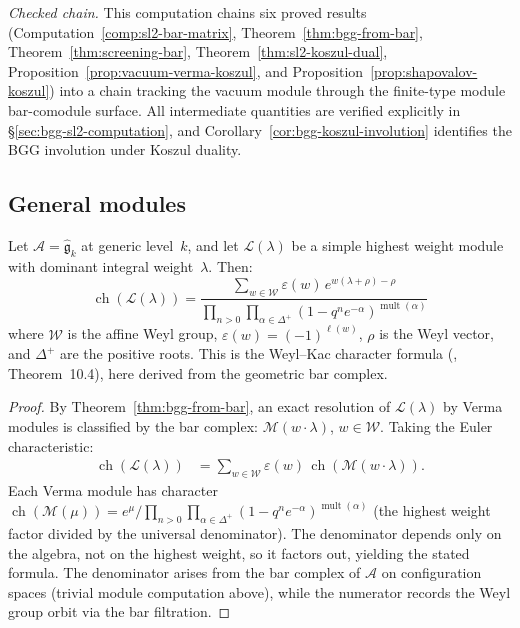 \begin{computation}
\emph{Checked chain.}
This computation chains six proved results (Computation~\ref{comp:sl2-bar-matrix},
Theorem~\ref{thm:bgg-from-bar}, Theorem~\ref{thm:screening-bar},
Theorem~\ref{thm:sl2-koszul-dual},
Proposition~\ref{prop:vacuum-verma-koszul},
and Proposition~\ref{prop:shapovalov-koszul}) into a chain tracking
the vacuum module through the finite-type module bar-comodule surface.
All intermediate quantities are verified explicitly in
\S\ref{sec:bgg-sl2-computation}, and
Corollary~\ref{cor:bgg-koszul-involution} identifies the BGG
involution under Koszul duality.
\end{computation}

\subsection{General modules}

\begin{theorem}
\label{thm:weyl-kac-geometric}
Let $\mathcal{A} = \widehat{\mathfrak{g}}_k$ at generic level~$k$,
and let $\mathcal{L}(\lambda)$ be a simple highest weight module
with dominant integral weight~$\lambda$. Then:
\[
\operatorname{ch}(\mathcal{L}(\lambda))
= \frac{\sum_{w \in \mathcal{W}} \varepsilon(w)\,
 e^{w(\lambda + \rho) - \rho}}
 {\prod_{n > 0} \prod_{\alpha \in \Delta^+}
 (1 - q^n e^{-\alpha})^{\operatorname{mult}(\alpha)}}
\]
where $\mathcal{W}$ is the affine Weyl group,
$\varepsilon(w) = (-1)^{\ell(w)}$, $\rho$ is the Weyl vector,
and $\Delta^+$ are the positive roots. This is the Weyl--Kac
character formula \textup{(\cite{Kac}, Theorem~10.4)}, here
derived from the geometric bar complex.
\end{theorem}

\begin{proof}
By Theorem~\ref{thm:bgg-from-bar}, an exact resolution of $\mathcal{L}(\lambda)$ by Verma modules is classified by the bar complex:
$\mathcal{M}(w \cdot \lambda)$, $w \in \mathcal{W}$.
Taking the Euler characteristic:
\begin{align}
\operatorname{ch}(\mathcal{L}(\lambda))
&= \sum_{w \in \mathcal{W}} \varepsilon(w)\,
 \operatorname{ch}(\mathcal{M}(w \cdot \lambda)).
\end{align}
Each Verma module has character
$\operatorname{ch}(\mathcal{M}(\mu))
= e^{\mu} / \prod_{n > 0} \prod_{\alpha \in \Delta^+}
(1 - q^n e^{-\alpha})^{\operatorname{mult}(\alpha)}$
(the highest weight factor divided by the universal
denominator). The denominator depends only on the algebra,
not on the highest weight, so it factors out, yielding
the stated formula. The denominator arises from the bar complex
of $\mathcal{A}$ on configuration spaces
(trivial module computation above), while the numerator
records the Weyl group orbit via the bar filtration.
\end{proof}

